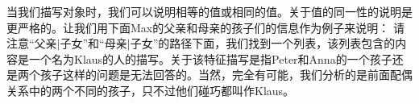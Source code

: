 当我们描写对象时，我们可以说明相等的值或相同的值。关于值的同一性的说明是更严格的。让我们用下面Max的父亲和母亲的孩子们的信息作为例子来说明：
\ea
{}
\z
请注意“\textsc{父亲$|$子女}”和“\textsc{母亲$|$子女}”的路径下面，我们找到一个列表，该列表包含的内容是一个名为Klaus的人的描写。关于该特征描写是指Peter和Anna的一个孩子还是两个孩子这样的问题是无法回答的。当然，完全有可能，我们分析的是前面配偶关系中的两个不同的孩子，只不过他们碰巧都叫作Klaus。


